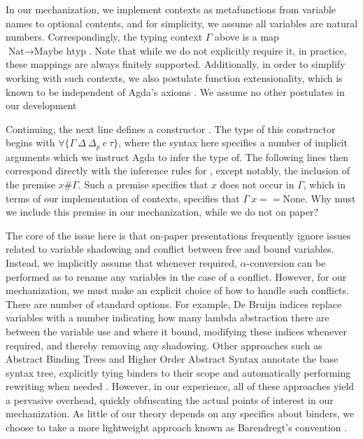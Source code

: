 In our mechanization, we implement contexts as metafunctions from variable names to optional contents, and for simplicity, we assume all variables are natural numbers. Correspondingly, the typing context $\Gamma$ above is a map $\text{Nat} \to \text{Maybe htyp}$. Note that while we do not explicitly require it, in practice, these mappings are always finitely supported. Additionally, in order to simplify working with such contexts, we also postulate function extensionality, which is known to be independent of Agda's axioms \cite{DBLP:conf/lics/AwodeyGS12}. We assume no other postulates in our development

Continuing, the next line defines a constructor \TLam. The type of this constructor begins with $\forall\{\Gamma~ \Delta~ \Delta_p~ e~ \tau\}$, where the syntax here specifies a number of implicit arguments which we instruct Agda to infer the type of. The following lines then correspond directly with the inference rules for \TLam, except notably, the inclusion of the premise $x \# \Gamma$. Such a premise specifies that $x$ does not occur  in $\Gamma$, which in terms of our implementation of contexts, specifies that $\Gamma~ x == \text{None}$. Why must we include this premise in our mechanization, while we do not on paper?

The core of the issue here is that on-paper presentations frequently ignore issues related to variable shadowing and conflict between free and bound variables. Instead, we implicitly assume that whenever required, $\alpha$-conversion can be performed as to rename any variables in the case of a conflict. However, for our mechanization, we must make an explicit choice of how to handle such conflicts. There are number of standard options. For example, De Bruijn indices replace variables with a number indicating how many lambda abstraction there are between the variable use and where it bound, modifying these indices whenever required, and thereby removing any shadowing. Other approaches such as Abstract Binding Trees and Higher Order Abstract Syntax annotate the base syntax tree, explicitly tying binders to their scope and automatically performing rewriting when needed \cite{Harper2012}. However, in our experience, all of these approaches yield a pervasive overhead, quickly obfuscating the actual points of interest in our mechanization. As little of our theory depends on any specifics about binders, we choose to take a more lightweight approach known as Barendregt's convention \cite{DBLP:books/daglib/0067558, DBLP:conf/cade/UrbanBN07}.

